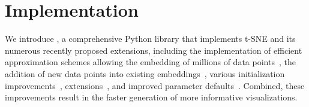 \documentclass[article]{jss}
\newcommand{\opentsne}{\pkg{openTSNE}}
\begin{document}
\section{Implementation} \label{sec:implementation}

We introduce \opentsne, a comprehensive Python library that implements t-SNE and
its numerous recently proposed extensions, including the implementation of
efficient approximation schemes allowing the embedding of millions of data
points~\citep{van2014accelerating,linderman2019fast}, the addition of new
data points into existing embeddings~\citep{policar2019embedding}, various
initialization improvements~\citep{kobak2019umap},
extensions~\citep{kobak2019heavy,kobak2019art}, and improved parameter
defaults~\citep{belkina2019automated}. Combined, these improvements result in
the faster generation of more informative visualizations.
\end{document}
